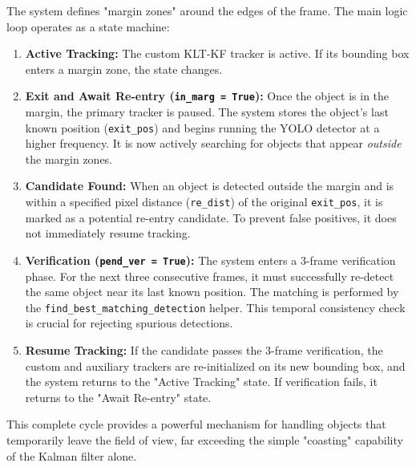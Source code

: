 \documentclass[12pt, a4paper]{article}
\begin{document}
The system defines "margin zones" around the edges of the frame. The main logic loop operates as a state machine:
\begin{enumerate}
    \item \textbf{Active Tracking:} The custom KLT-KF tracker is active. If its bounding box enters a margin zone, the state changes.
    \item \textbf{Exit and Await Re-entry (\lstinline!in_marg = True!):} Once the object is in the margin, the primary tracker is paused. The system stores the object's last known position (\lstinline!exit_pos!) and begins running the YOLO detector at a higher frequency. It is now actively searching for objects that appear \textit{outside} the margin zones.
    \item \textbf{Candidate Found:} When an object is detected outside the margin and is within a specified pixel distance (\lstinline!re_dist!) of the original \lstinline!exit_pos!, it is marked as a potential re-entry candidate. To prevent false positives, it does not immediately resume tracking.
    \item \textbf{Verification (\lstinline!pend_ver = True!):} The system enters a 3-frame verification phase. For the next three consecutive frames, it must successfully re-detect the same object near its last known position. The matching is performed by the \lstinline!find_best_matching_detection! helper. This temporal consistency check is crucial for rejecting spurious detections.
    \item \textbf{Resume Tracking:} If the candidate passes the 3-frame verification, the custom and auxiliary trackers are re-initialized on its new bounding box, and the system returns to the "Active Tracking" state. If verification fails, it returns to the "Await Re-entry" state.
\end{enumerate}
This complete cycle provides a powerful mechanism for handling objects that temporarily leave the field of view, far exceeding the simple "coasting" capability of the Kalman filter alone.
\end{document}
